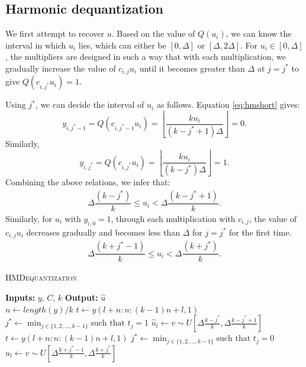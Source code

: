 \subsection{Harmonic dequantization}
\label{sec:harmonic}
We first attempt to recover $u$. Based on the value of $Q(u_i)$, we can know the interval in which $u_i$ lies, which can either be $[0,\Delta]$ or $[\Delta,2\Delta]$. For $u_i \in [0,\Delta]$, the multipliers are designed in such a way that with each multiplication, we gradually increase the value of $c_{i,j}u_i$ until it becomes greater than $\Delta$ at $j=j^*$ to give $Q(c_{i,j^*}u_i)=1$. 

Using $j^*$, we can decide the interval of $u_i$ as follows. %
Equation \eqref{eq:hmshort} gives:
\[
y_{i,{j^*-1}} = Q(c_{i,j^*-1} u_i) = \left \lfloor{\dfrac{k u_i}{(k-j^*+1) \Delta}}\right \rfloor = 0.
\]
Similarly, 
\[
y_{i,{j^*}} = Q(c_{i,j^*} u_i) = \left \lfloor{\dfrac{k u_i}{(k-j^*) \Delta}}\right \rfloor = 1.
\]
Combining the above relations, we infer that:
\begin{align}
\label{eq:hminter1}
\Delta \dfrac{(k-j^*)}{k} \leq u_i < \Delta \dfrac{(k-j^*+1)}{k}.
\end{align}
Similarly, for $u_i$ with $y_{i,0}=1$, through each multiplication with $c_{i,j}$, the value of $c_{i,j} u_i$ decreases gradually and becomes less than $\Delta$ for $j=j^*$ for the first time. 
\begin{align}
\label{eq:hminter2}
\Delta \dfrac{(k+j^*-1)}{k} \leq u_i < \Delta \dfrac{(k+j^*)}{k}.
\end{align}
\begin{algorithm}[t]
	\caption{\textsc{HMDequantization}}
	\label{alg:HM}
	\begin{algorithmic}
		\State\textbf{Inputs:} $y$, $C$, $k$
		\State\textbf{Output:}  $\widehat{u}$\\
		$n \leftarrow length(y)/k$
		\State $t \leftarrow y(l+n:n:(k-1)n+l,1)$
		\State $j^* \leftarrow \min_{j \in \{1,2,...,k-1\}} \text{such that } t_j = 1$
		\State $\widehat{u}_{l} \leftarrow v \sim U[\Delta\frac{k-j^*}{k},\Delta
		\frac{k-j^*+1}{k}]$
		\State $t \leftarrow y(l+n:n:(k-1)n+l,1)$
		\State $j^* \leftarrow \min_{j \in \{1,2,...,k-1\}} \text{such that } t_j = 0$
		\State $\widehat{u}_{l} \leftarrow v \sim U[\Delta\frac{k+j^*-1}{k},\Delta\frac{k+j^*}{k}]$
		\EndIf
		\EndFor
		
	\end{algorithmic}
\end{algorithm}
